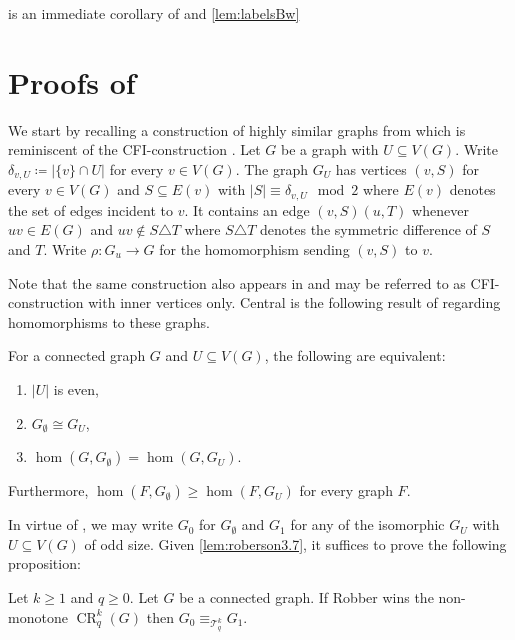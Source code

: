 \documentclass[a4paper,UKenglish,cleveref, autoref, thm-restate]{lipics-v2021}
\newcommand{\Ekq}{\ensuremath{\mathcal{T}_{q}^{k}}}
\DeclareMathOperator{\CR}{CR}
\begin{document}
 is an immediate corollary of  and \ref{lem:labelsBw}

 
\section{Proofs of }
\label{app:td-closed}
We start by recalling a construction of highly similar graphs from \cite{roberson_oddomorphisms_2022} which is reminiscent of the CFI-construction \cite{cai_optimal_1992}.
Let $G$ be a graph with $U \subseteq V(G)$. Write $\delta_{v, U} \coloneqq |\{v\} \cap U|$ for every $v\in V(G)$.
The graph $G_U$ has vertices $(v, S)$ for every $v \in V(G)$ and $S \subseteq E(v)$ with $|S| \equiv \delta_{v, U} \mod 2$ where $E(v)$ denotes the set of edges incident to $v$. It contains an edge $(v, S)(u, T)$ whenever $uv \in E(G)$ and $uv \not\in S \triangle T$ where $S\triangle T$ denotes the symmetric difference of $S$ and $T$. Write $\rho \colon G_u \to G$ for the homomorphism sending $(v, S)$ to $v$.

Note that the same construction also appears in \cite{Furer01} and may be referred to as CFI-construction with inner vertices only. Central is the following result of \cite{roberson_oddomorphisms_2022} regarding homomorphisms to these graphs.

\begin{lemma} \label{lem:roberson3.7}
	For a connected graph $G$ and $U \subseteq V(G)$, the following are equivalent:
	\begin{enumerate}
		\item $|U|$ is even,
		\item $G_\emptyset \cong G_U$,
		\item $\hom(G, G_\emptyset) = \hom(G, G_U)$.
	\end{enumerate}
	Furthermore, $\hom(F, G_\emptyset) \geq \hom(F, G_U)$ for every graph $F$.
\end{lemma}
In virtue of \cite[Lemma~3.2]{roberson_oddomorphisms_2022}, we may write $G_0$ for $G_\emptyset$ and $G_1$ for any of the isomorphic $G_U$ with $U \subseteq V(G)$ of odd size.
Given \cref{lem:roberson3.7}, it suffices to prove the following proposition:

\begin{proposition}\label{prop:closedness-td-core}
	Let $k \geq 1$ and $q \geq 0$.
	Let $G$ be a connected graph.
	If Robber wins the non-monotone $\CR^k_q(G)$ then $G_0 \equiv_{\Ekq} G_1$.
\end{proposition}
\end{document}
